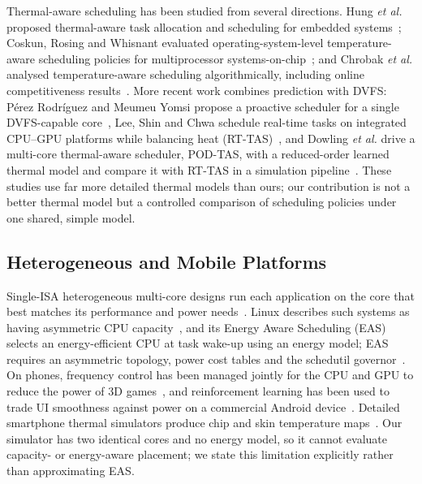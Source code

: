 \documentclass[conference]{IEEEtran}
\begin{document}
Thermal-aware scheduling has been studied from several directions. Hung \emph{et al.} proposed thermal-aware task allocation and scheduling for embedded systems~\cite{hung2005}; Coskun, Rosing and Whisnant evaluated operating-system-level temperature-aware scheduling policies for multiprocessor systems-on-chip~\cite{coskun2007}; and Chrobak \emph{et al.} analysed temperature-aware scheduling algorithmically, including online competitiveness results~\cite{chrobak2008}. More recent work combines prediction with DVFS: P\'{e}rez Rodr\'{i}guez and Meumeu Yomsi propose a proactive scheduler for a single DVFS-capable core~\cite{perez2021}, Lee, Shin and Chwa schedule real-time tasks on integrated CPU--GPU platforms while balancing heat (RT-TAS)~\cite{lee2019}, and Dowling \emph{et al.} drive a multi-core thermal-aware scheduler, POD-TAS, with a reduced-order learned thermal model and compare it with RT-TAS in a simulation pipeline~\cite{dowling2025}. These studies use far more detailed thermal models than ours; our contribution is not a better thermal model but a controlled comparison of scheduling policies under one shared, simple model.

\subsection{Heterogeneous and Mobile Platforms}\label{sec:rw-hetero}
Single-ISA heterogeneous multi-core designs run each application on the core that best matches its performance and power needs~\cite{kumar2003}. Linux describes such systems as having asymmetric CPU capacity~\cite{kdoc_capacity}, and its Energy Aware Scheduling (EAS) selects an energy-efficient CPU at task wake-up using an energy model; EAS requires an asymmetric topology, power cost tables and the schedutil governor~\cite{kdoc_eas}. On phones, frequency control has been managed jointly for the CPU and GPU to reduce the power of 3D games~\cite{pathania2014}, and reinforcement learning has been used to trade UI smoothness against power on a commercial Android device~\cite{dou2025}. Detailed smartphone thermal simulators produce chip and skin temperature maps~\cite{xie2014}. Our simulator has two identical cores and no energy model, so it cannot evaluate capacity- or energy-aware placement; we state this limitation explicitly rather than approximating EAS.
\end{document}
